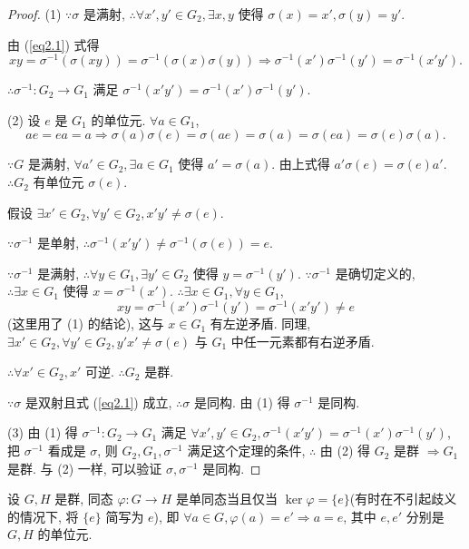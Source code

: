 \documentclass[color=black,device=normal,lang=cn,mode=geye]{elegantnote}
\begin{document}
\begin{proof}
    (1) $\because\sigma$ 是满射, $\therefore\forall x',y'\in G_2,\exists x,y$ 使得 $\sigma(x)=x',\sigma(y)=y'$.

    由 (\ref{eq2.1}) 式得
    \[xy=\sigma^{-1}(\sigma(xy))=\sigma^{-1}(\sigma(x)\sigma(y))\Rightarrow\sigma^{-1}(x')\sigma^{-1}(y')=\sigma^{-1}(x'y').\]

    $\therefore\sigma^{-1}:G_2\to G_1$ 满足 $\sigma^{-1}(x'y')=\sigma^{-1}(x')\sigma^{-1}(y')$.

    (2) 设 $e$ 是 $G_1$ 的单位元. $\forall a\in G_1$,
    \[ae=ea=a\Rightarrow\sigma(a)\sigma(e)=\sigma(ae)=\sigma(a)=\sigma(ea)=\sigma(e)\sigma(a).\]

    $\because G$ 是满射, $\forall a'\in G_2,\exists a\in G_1$ 使得 $a'=\sigma(a)$. 由上式得 $a'\sigma(e)=\sigma(e)a'$. $\therefore G_2$ 有单位元 $\sigma(e)$.

    假设 $\exists x'\in G_2,\forall y'\in G_2,x'y'\neq\sigma(e)$.
    
    $\because\sigma^{-1}$ 是单射, $\therefore\sigma^{-1}(x'y')\neq\sigma^{-1}(\sigma(e))=e$.

    $\because\sigma^{-1}$ 是满射, $\therefore\forall y\in G_1,\exists y'\in G_2$ 使得 $y=\sigma^{-1}(y')$. $\because\sigma^{-1}$ 是确切定义的, $\therefore\exists x\in G_1$ 使得 $x=\sigma^{-1}(x')$. $\therefore\exists x\in G_1,\forall y\in G_1$,
    \[xy=\sigma^{-1}(x')\sigma^{-1}(y')=\sigma^{-1}(x'y')\neq e\]
    (这里用了 (1) 的结论), 这与 $x\in G_1$ 有左逆矛盾. 同理, $\exists x'\in G_2,\forall y'\in G_2,y'x'\neq\sigma(e)$ 与 $G_1$ 中任一元素都有右逆矛盾.
    
    $\therefore\forall x'\in G_2,x'$ 可逆. $\therefore G_2$ 是群.
    
    $\because\sigma$ 是双射且式 (\ref{eq2.1}) 成立, $\therefore\sigma$ 是同构. 由 (1) 得 $\sigma^{-1}$ 是同构.

    (3) 由 (1) 得 $\sigma^{-1}:G_2\to G_1$ 满足 $\forall x',y'\in G_2,\sigma^{-1}(x'y')=\sigma^{-1}(x')\sigma^{-1}(y')$, 把 $\sigma^{-1}$ 看成是 $\sigma$, 则 $G_2,G_1,\sigma^{-1}$ 满足这个定理的条件, $\therefore$ 由 (2) 得 $G_2$ 是群 $\Rightarrow G_1$ 是群. 与 (2) 一样, 可以验证 $\sigma,\sigma^{-1}$ 是同构.
\end{proof}
\begin{theorem}
    设 $G,H$ 是群, 同态 $\varphi:G\to H$ 是单同态当且仅当 $\ker\varphi=\{e\}$(有时在不引起歧义的情况下, 将 $\{e\}$ 简写为 $e$), 即 $\forall a\in G,\varphi(a)=e'\Rightarrow a=e$, 其中 $e,e'$ 分别是 $G,H$ 的单位元.
\end{theorem}
\end{document}
